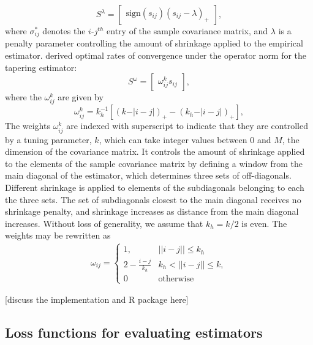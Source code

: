 \documentclass[12pt]{article}
\theoremstyle{definition}
\begin{document}
\[
S^{\lambda}=   \begin{bmatrix} \mbox{sign}\left(s_{ij}\right) \left(s_{ij} - \lambda\right)_+ \end{bmatrix},
\]
\noindent 
where $\sigma^*_{ij}$ denotes the $i$-$j^{th}$ entry of the sample covariance matrix, and $\lambda$ is a penalty parameter controlling the amount of shrinkage applied to the empirical estimator. \citet{cai2010optimal} derived optimal rates of convergence under the operator norm for the tapering estimator:
\[
S^{\omega} =  \begin{bmatrix} \omega_{ij}^k s_{ij} \end{bmatrix},
\]
\noindent
where the $\omega_{ij}^k$ are given by 
\begin{equation*}
\omega^k_{ij} = k_h^{-1} \left[ \left( k - \vert i-j\vert\right)_+ - \left(k_h - \vert i-j\vert\right)_+ \right],
\end{equation*}
\noindent
The weights $\omega^k_{ij}$ are indexed with superscript to indicate that they  are controlled by a tuning parameter, $k$,  which can take integer values between 0 and $M$, the dimension of the covariance matrix. It controls the amount of shrinkage applied to the elements of the sample covariance matrix by defining a window from the main diagonal of the estimator, which determines three sets of off-diagonals. Different shrinkage is applied to elements of the subdiagonals belonging to each the three sets. The set of subdiagonals closest to the main diagonal receives no shrinkage penalty, and shrinkage increases as distance from the main diagonal increases.  Without loss of generality,  we assume that $k_h = k/2$ is even. The weights may be rewritten as
\begin{align*}
\omega_{ij} = \left\{\begin{array}{ll} 1, & \vert \vert i -j \vert \vert \le k_h \\
                             2 - \frac{i - j}{k_h} & k_h < \vert \vert i -j \vert \vert \le k, \\
                             0 & \mbox{otherwise}  \end{array} \right.
\end{align*}
\noindent




\bigskip

[discuss the implementation and R package here]

\subsection{Loss functions for evaluating estimators}
\end{document}
